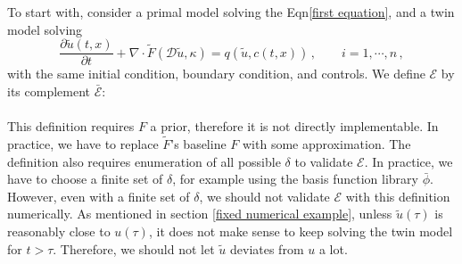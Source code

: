 \documentclass[a4paper,onecolumn]{article}
\newtheorem{definition}{Definition}
\theoremstyle{remark}
\begin{document}
\noindent To start with, 
consider a primal model solving the Eqn\eqref{first equation}, and a twin model solving
\begin{equation}
    \frac{\partial\tilde{u}(t,x)}{\partial t} + \nabla \cdot 
    \tilde{F}(\mathcal{D} \tilde{u}, \kappa) 
    = q(\tilde{u},c(t,x))\,, \qquad i=1,\cdots, n\,,
    \label{twin equation def}
\end{equation}
with the same initial condition, boundary condition, and controls. We define $\mathcal{E}$ by
its complement $\bar{\mathcal{E}}$:\\
\\

\noindent This definition requires $F$ a prior, therefore it is not directly implementable.
In practice, we have to replace $\tilde{F}$'s baseline $F$ with some approximation.
The definition also requires enumeration of all possible $\delta$ to validate $\mathcal{E}$.
In practice, we have to choose a finite set of $\delta$, for example using the basis function library
$\bar{\phi}$.
However, even with a finite set of $\delta$, we should not validate $\mathcal{E}$ 
with this definition numerically.
As mentioned in section \ref{fixed numerical example}, unless $\tilde{u}(\tau)$
is reasonably close to $u(\tau)$, it does not make sense to keep solving the twin model for $t>\tau$.
Therefore, we should not let $\tilde{u}$ deviates from $u$ a lot.
\\
\end{document}
